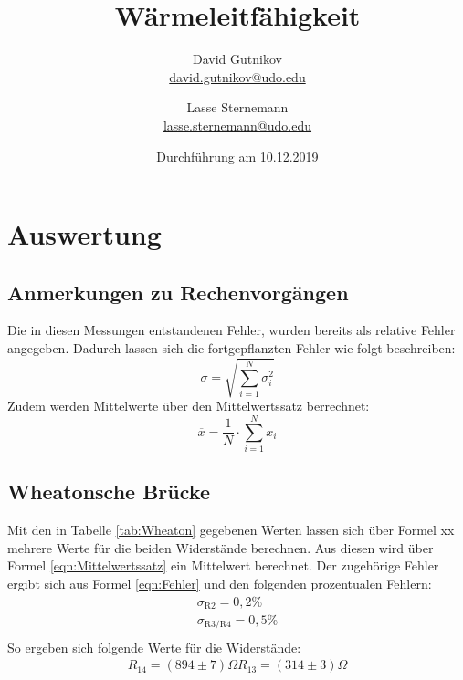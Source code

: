 \documentclass[titlepage = firstcover]{scrartcl}
\title{Wärmeleitfähigkeit}
\author{
  David Gutnikov\\
  \href{mailto:david.gutnikov@udo.edu}{david.gutnikov@udo.edu}
 \and 
  Lasse Sternemann\\
  \href{mailto:lasse.sternemann@udo.edu}{lasse.sternemann@udo.edu}
}
\date{Durchführung am 10.12.2019}
\begin{document}
  \maketitle
  \newpage
  \tableofcontents
  \newpage


  \section{Auswertung}

  \subsection{Anmerkungen zu Rechenvorgängen}
  Die in diesen Messungen entstandenen Fehler, wurden bereits als relative Fehler angegeben. Dadurch lassen sich die fortgepflanzten Fehler wie folgt 
  beschreiben:
  \begin{equation}
      \sigma = \sqrt{\sum_{i=1}^N \sigma_i^2}
      \label{eqn:Fehler}
  \end{equation}
  Zudem werden Mittelwerte über den Mittelwertssatz berrechnet:
  \begin{equation}
    \overline{x} = \frac{1}{N} \cdot \sum_{i=1}^{N} x_i
    \label{eqn:Mittelwertssatz}
  \end{equation}

  \subsection{Wheatonsche Brücke}
  Mit den in Tabelle \ref{tab:Wheaton} gegebenen Werten lassen sich über Formel xx mehrere Werte für die beiden Widerstände berechnen. Aus diesen wird über 
  Formel \ref{eqn:Mittelwertssatz} ein Mittelwert berechnet. Der zugehörige Fehler ergibt sich aus Formel \ref{eqn:Fehler} und den folgenden prozentualen
  Fehlern:
  \begin{align*}
      \sigma_{\text{R2}} = 0,2 \% \\
      \sigma_{\text{R3/R4}} = 0,5 \% \\
  \end{align*}
  So ergeben sich folgende Werte für die Widerstände:
  \begin{align*}
      R_{14} = (894 \pm 7) \Omega
      R_{13} = (314 \pm 3) \Omega
  \end{align*}
\end{document}
